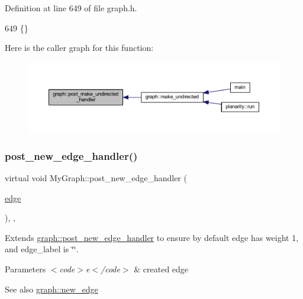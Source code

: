 Definition at line 649 of file graph.\+h.


\begin{DoxyCode}
649 \{\}
\end{DoxyCode}
Here is the caller graph for this function\+:
\nopagebreak
\begin{figure}[H]
\begin{center}
\leavevmode
\includegraphics[width=350pt]{classgraph_a3d2bc348d12931aff1d2e97a6b4285c3_icgraph}
\end{center}
\end{figure}
\mbox{\label{class_my_graph_a7d8f03bae7c6a731718385ae4e546d98}} 
\subsubsection{\texorpdfstring{post\+\_\+new\+\_\+edge\+\_\+handler()}{post\_new\_edge\_handler()}}
{\footnotesize\ttfamily virtual void My\+Graph\+::post\+\_\+new\+\_\+edge\+\_\+handler (\begin{DoxyParamCaption}\item[{\mbox{\hyperlink{classedge}{edge}}}]{ }\end{DoxyParamCaption})\hspace{0.3cm}{\ttfamily [inline]}, {\ttfamily [virtual]}, {\ttfamily [inherited]}}

Extends \mbox{\hyperlink{classgraph_a443182426b461aa9f4b1c9f5ac535179}{graph\+::post\+\_\+new\+\_\+edge\+\_\+handler}} to ensure by default edge has weight 1, and edge\+\_\+label is \char`\"{}\char`\"{}.


\begin{DoxyParams}{Parameters}
{\em $<$code$>$e$<$/code$>$} & created edge \\
\hline
\end{DoxyParams}
\begin{DoxySeeAlso}{See also}
\mbox{\hyperlink{classgraph_a02a0c3a219f75d68caa408ef339d4a1c}{graph\+::new\+\_\+edge}} 
\end{DoxySeeAlso}


